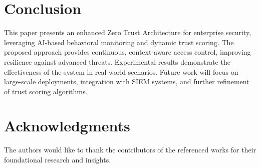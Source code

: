 \documentclass[conference]{IEEEtran}
\begin{document}

\section{Conclusion}
This paper presents an enhanced Zero Trust Architecture for enterprise security, leveraging AI-based behavioral monitoring and dynamic trust scoring. The proposed approach provides continuous, context-aware access control, improving resilience against advanced threats. Experimental results demonstrate the effectiveness of the system in real-world scenarios. Future work will focus on large-scale deployments, integration with SIEM systems, and further refinement of trust scoring algorithms.

\section*{Acknowledgments}
The authors would like to thank the contributors of the referenced works for their foundational research and insights.
\end{document}
